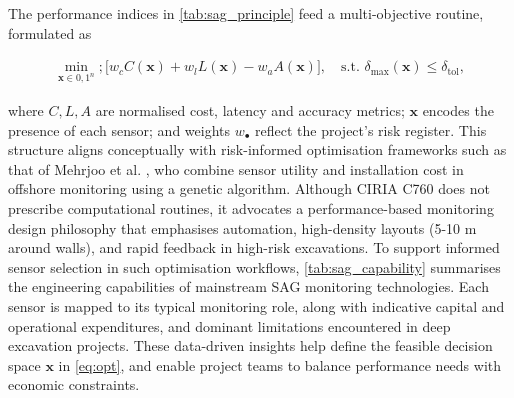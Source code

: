 \documentclass[preprint,11pt,authoryear,3p]{elsarticle}
\begin{document}
The performance indices in \autoref{tab:sag_principle} feed a multi-objective routine, formulated as

\begin{align}
\min_{\mathbf{x}\in{0,1}^n}
; \bigl[w_c C(\mathbf{x}) + w_l L(\mathbf{x}) - w_a A(\mathbf{x}) \bigr],
\quad
\text{s.t. } \delta_{\max}(\mathbf{x}) \le \delta_{\mathrm{tol}},
\label{eq:opt}
\end{align}

where $C, L, A$ are normalised cost, latency and accuracy metrics; $\mathbf{x}$ encodes the presence of each sensor; and weights $w_\bullet$ reflect the project's risk register. This structure aligns conceptually with risk-informed optimisation frameworks such as that of Mehrjoo et al. \citep{MEHRJOO2022108787}, who combine sensor utility and installation cost in offshore monitoring using a genetic algorithm. Although CIRIA C760 does not prescribe computational routines, it advocates a performance-based monitoring design philosophy that emphasises automation, high-density layouts (5-10 m around walls), and rapid feedback in high-risk excavations\citep{CIRIA760}. To support informed sensor selection in such optimisation workflows, \autoref{tab:sag_capability} summarises the engineering capabilities of mainstream SAG monitoring technologies. Each sensor is mapped to its typical monitoring role, along with indicative capital and operational expenditures, and dominant limitations encountered in deep excavation projects. These data-driven insights help define the feasible decision space \(\mathbf{x}\) in \autoref{eq:opt}, and enable project teams to balance performance needs with economic constraints.
\end{document}
